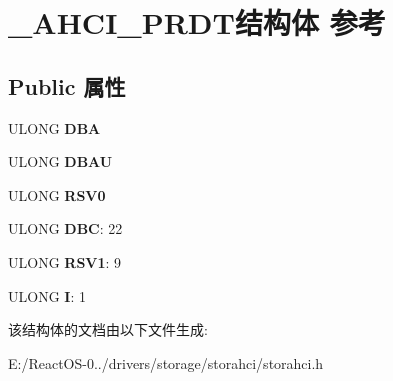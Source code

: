 \hypertarget{struct___a_h_c_i___p_r_d_t}{}\section{\+\_\+\+A\+H\+C\+I\+\_\+\+P\+R\+D\+T结构体 参考}
\label{struct___a_h_c_i___p_r_d_t}
\subsection*{Public 属性}
\begin{DoxyCompactItemize}
\item 
\mbox{\label{struct___a_h_c_i___p_r_d_t_a78ed3acb97a96f78eeef80863fa2398b}} 
U\+L\+O\+NG {\bfseries D\+BA}
\item 
\mbox{\label{struct___a_h_c_i___p_r_d_t_aa8ecc8f451ca2b5a0dca30310e60e002}} 
U\+L\+O\+NG {\bfseries D\+B\+AU}
\item 
\mbox{\label{struct___a_h_c_i___p_r_d_t_aca888c7726c0f96fac03c25e32a2cac2}} 
U\+L\+O\+NG {\bfseries R\+S\+V0}
\item 
\mbox{\label{struct___a_h_c_i___p_r_d_t_af94220cd1447c524c3d19ca4fd400c13}} 
U\+L\+O\+NG {\bfseries D\+BC}\+: 22
\item 
\mbox{\label{struct___a_h_c_i___p_r_d_t_ab7fad3a5e8974a36d2ef21216c9b870c}} 
U\+L\+O\+NG {\bfseries R\+S\+V1}\+: 9
\item 
\mbox{\label{struct___a_h_c_i___p_r_d_t_aac50628e4e921c581f085e9443bcf631}} 
U\+L\+O\+NG {\bfseries I}\+: 1
\end{DoxyCompactItemize}


该结构体的文档由以下文件生成\+:\begin{DoxyCompactItemize}
\item 
E\+:/\+React\+O\+S-\/0../drivers/storage/storahci/storahci.\+h\end{DoxyCompactItemize}
